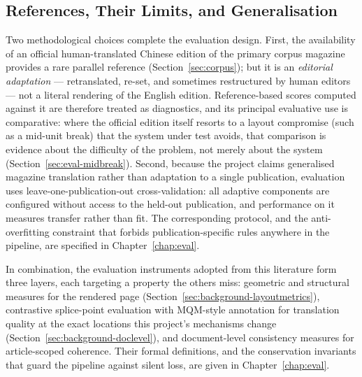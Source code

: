 \subsection{References, Their Limits, and Generalisation}

Two methodological choices complete the evaluation design. First, the
availability of an official human-translated Chinese edition of the
primary corpus magazine provides a rare parallel reference
(Section~\ref{sec:corpus}); but it is an \emph{editorial adaptation}
--- retranslated, re-set, and sometimes restructured by human editors
--- not a literal rendering of the English edition. Reference-based
scores computed against it are therefore treated as diagnostics, and
its principal evaluative use is comparative: where the official
edition itself resorts to a layout compromise (such as a mid-unit
break) that the system under test avoids, that comparison is evidence
about the difficulty of the problem, not merely about the system
(Section~\ref{sec:eval-midbreak}). Second, because the project claims
generalised magazine translation rather than adaptation to a single
publication, evaluation uses leave-one-publication-out cross-validation:
all adaptive components are configured without access to the held-out
publication, and performance on it measures transfer rather than fit.
The corresponding protocol, and the anti-overfitting constraint that
forbids publication-specific rules anywhere in the pipeline, are
specified in Chapter~\ref{chap:eval}.

In combination, the evaluation instruments adopted from this
literature form three layers, each targeting a property the others
miss: geometric and structural measures for the rendered page
(Section~\ref{sec:background-layoutmetrics}), contrastive splice-point
evaluation with MQM-style annotation for translation quality at the
exact locations this project's mechanisms change
(Section~\ref{sec:background-doclevel}), and document-level consistency
measures for article-scoped coherence. Their formal definitions, and
the conservation invariants that guard the pipeline against silent
loss, are given in Chapter~\ref{chap:eval}.
